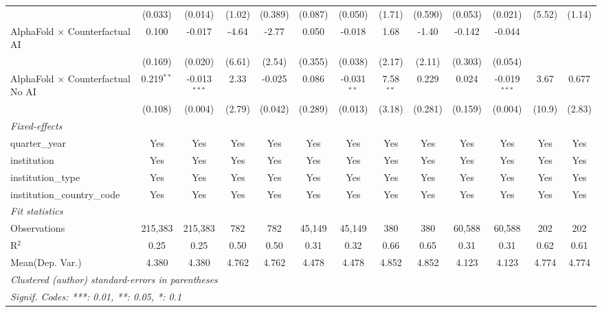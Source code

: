 \begin{tabular}{lcccccccccccc}
                                            & (0.033)      & (0.014)        & (1.02)     & (0.389) & (0.087)       & (0.050)       & (1.71)      & (0.590) & (0.053)       & (0.021)        & (5.52) & (1.14)\\   
   AlphaFold $\times$ Counterfactual AI     & 0.100        & -0.017         & -4.64      & -2.77   & 0.050         & -0.018        & 1.68        & -1.40   & -0.142        & -0.044         &        &   \\   
                                            & (0.169)      & (0.020)        & (6.61)     & (2.54)  & (0.355)       & (0.038)       & (2.17)      & (2.11)  & (0.303)       & (0.054)        &        &   \\   
   AlphaFold $\times$ Counterfactual No AI  & 0.219$^{**}$ & -0.013$^{***}$ & 2.33       & -0.025  & 0.086         & -0.031$^{**}$ & 7.58$^{**}$ & 0.229   & 0.024         & -0.019$^{***}$ & 3.67   & 0.677\\   
                                            & (0.108)      & (0.004)        & (2.79)     & (0.042) & (0.289)       & (0.013)       & (3.18)      & (0.281) & (0.159)       & (0.004)        & (10.9) & (2.83)\\   
   \midrule
   \emph{Fixed-effects}\\
   quarter\_year                            & Yes          & Yes            & Yes        & Yes     & Yes           & Yes           & Yes         & Yes     & Yes           & Yes            & Yes    & Yes\\  
   institution                              & Yes          & Yes            & Yes        & Yes     & Yes           & Yes           & Yes         & Yes     & Yes           & Yes            & Yes    & Yes\\  
   institution\_type                        & Yes          & Yes            & Yes        & Yes     & Yes           & Yes           & Yes         & Yes     & Yes           & Yes            & Yes    & Yes\\  
   institution\_country\_code               & Yes          & Yes            & Yes        & Yes     & Yes           & Yes           & Yes         & Yes     & Yes           & Yes            & Yes    & Yes\\  
   \midrule
   \emph{Fit statistics}\\
   Observations                             & 215,383      & 215,383        & 782        & 782     & 45,149        & 45,149        & 380         & 380     & 60,588        & 60,588         & 202    & 202\\  
   R$^2$                                    & 0.25         & 0.25           & 0.50       & 0.50    & 0.31          & 0.32          & 0.66        & 0.65    & 0.31          & 0.31           & 0.62   & 0.61\\  
Mean(Dep. Var.) & 4.380 & 4.380 & 4.762 & 4.762 & 4.478 & 4.478 & 4.852 & 4.852 & 4.123 & 4.123 & 4.774 & 4.774 \\
   \midrule \midrule
   \multicolumn{13}{l}{\emph{Clustered (author) standard-errors in parentheses}}\\
   \multicolumn{13}{l}{\emph{Signif. Codes: ***: 0.01, **: 0.05, *: 0.1}}\\
\end{tabular}
\par\endgroup
